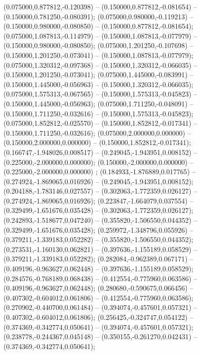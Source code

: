  (0.075000,0.877812,-0.120398) -- (0.150000,0.877812,-0.081654) -- (0.150000,0.781250,-0.080391);
 (0.075000,0.980000,-0.119213) -- (0.150000,0.980000,-0.080850) -- (0.150000,0.877812,-0.081654);
 (0.075000,1.087813,-0.114979) -- (0.150000,1.087813,-0.077979) -- (0.150000,0.980000,-0.080850);
 (0.075000,1.201250,-0.107698) -- (0.150000,1.201250,-0.073041) -- (0.150000,1.087813,-0.077979);
 (0.075000,1.320312,-0.097368) -- (0.150000,1.320312,-0.066035) -- (0.150000,1.201250,-0.073041);
 (0.075000,1.445000,-0.083991) -- (0.150000,1.445000,-0.056963) -- (0.150000,1.320312,-0.066035);
 (0.075000,1.575313,-0.067565) -- (0.150000,1.575313,-0.045823) -- (0.150000,1.445000,-0.056963);
 (0.075000,1.711250,-0.048091) -- (0.150000,1.711250,-0.032616) -- (0.150000,1.575313,-0.045823);
 (0.075000,1.852812,-0.025570) -- (0.150000,1.852812,-0.017341) -- (0.150000,1.711250,-0.032616);
 (0.075000,2.000000,0.000000) -- (0.150000,2.000000,0.000000) -- (0.150000,1.852812,-0.017341);
 (0.166747,-1.948026,0.008517) -- (0.249045,-1.943951,0.008152) -- (0.225000,-2.000000,0.000000);
 (0.150000,-2.000000,0.000000) -- (0.225000,-2.000000,0.000000) ;
 (0.184933,-1.876889,0.017765) -- (0.274924,-1.869065,0.016926) -- (0.249045,-1.943951,0.008152);
 (0.204188,-1.783146,0.027557) -- (0.302063,-1.772359,0.026127) -- (0.274924,-1.869065,0.016926);
 (0.223847,-1.664079,0.037554) -- (0.329499,-1.651676,0.035428) -- (0.302063,-1.772359,0.026127);
 (0.242893,-1.518677,0.047240) -- (0.355820,-1.506550,0.044352) -- (0.329499,-1.651676,0.035428);
 (0.259972,-1.348796,0.055926) -- (0.379211,-1.339183,0.052282) -- (0.355820,-1.506550,0.044352);
 (0.273531,-1.160130,0.062821) -- (0.397636,-1.155189,0.058529) -- (0.379211,-1.339183,0.052282);
 (0.282084,-0.962389,0.067171) -- (0.409196,-0.963627,0.062448) -- (0.397636,-1.155189,0.058529);
 (0.284576,-0.768189,0.068438) -- (0.412554,-0.775960,0.063586) -- (0.409196,-0.963627,0.062448);
 (0.280680,-0.590675,0.066456) -- (0.407302,-0.604012,0.061806) -- (0.412554,-0.775960,0.063586);
 (0.270902,-0.440700,0.061484) -- (0.394074,-0.457601,0.057321) -- (0.407302,-0.604012,0.061806);
 (0.256425,-0.324747,0.054122) -- (0.374369,-0.342774,0.050641) -- (0.394074,-0.457601,0.057321);
 (0.238778,-0.244367,0.045148) -- (0.350155,-0.261270,0.042431) -- (0.374369,-0.342774,0.050641);
